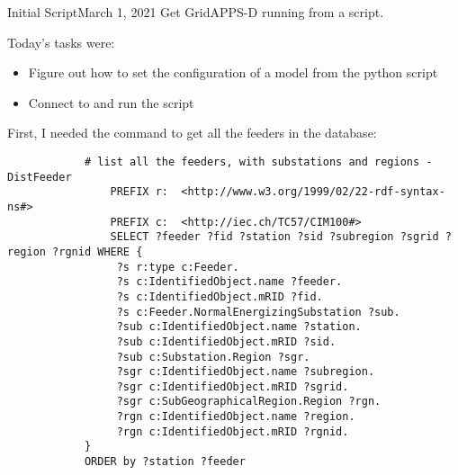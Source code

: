 \begin{entry}{Initial Script}{March 1, 2021}
    \objective
    Get GridAPPS-D running from a script.

    \outline

    Today's tasks were:
        \begin{itemize}
            \item Figure out how to set the configuration of a model from the python script
            \item Connect to and run the script

        \end{itemize}

    \procedures

        First, I needed the command to get all the feeders in the database:
        \begin{verbatim}
            # list all the feeders, with substations and regions - DistFeeder
                PREFIX r:  <http://www.w3.org/1999/02/22-rdf-syntax-ns#>
                PREFIX c:  <http://iec.ch/TC57/CIM100#>
                SELECT ?feeder ?fid ?station ?sid ?subregion ?sgrid ?region ?rgnid WHERE {
                 ?s r:type c:Feeder.
                 ?s c:IdentifiedObject.name ?feeder.
                 ?s c:IdentifiedObject.mRID ?fid.
                 ?s c:Feeder.NormalEnergizingSubstation ?sub.
                 ?sub c:IdentifiedObject.name ?station.
                 ?sub c:IdentifiedObject.mRID ?sid.
                 ?sub c:Substation.Region ?sgr.
                 ?sgr c:IdentifiedObject.name ?subregion.
                 ?sgr c:IdentifiedObject.mRID ?sgrid.
                 ?sgr c:SubGeographicalRegion.Region ?rgn.
                 ?rgn c:IdentifiedObject.name ?region.
                 ?rgn c:IdentifiedObject.mRID ?rgnid.
            }
            ORDER by ?station ?feeder
        \end{verbatim}


\end{entry}
